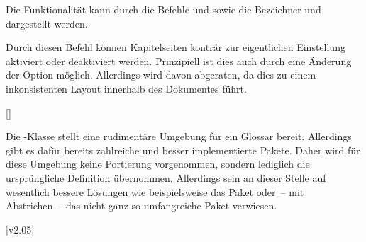 \begin{Declaration*}{}
\begin{Declaration}{}
\printdeclarationlist*%
%
Die Funktionalität kann durch die Befehle  und 
 sowie die Bezeichner  und 
 dargestellt werden.
\end{Declaration}

\begin{Declaration}{}
\printdeclarationlist*%
%
Durch diesen Befehl können Kapitelseiten konträr zur eigentlichen Einstellung 
aktiviert oder deaktiviert werden. Prinzipiell ist dies auch durch eine 
Änderung der Option  möglich. Allerdings wird davon 
abgeraten, da dies zu einem inkonsistenten Layout innerhalb des Dokumentes 
führt.
\end{Declaration}

\begin{Declaration}{[]}
\begin{Declaration}{}
\printdeclarationlist*%
%
Die -Klasse stellt eine rudimentäre Umgebung für ein Glossar 
bereit. Allerdings gibt es dafür bereits zahlreiche und besser implementierte 
Pakete. Daher wird für diese Umgebung keine Portierung vorgenommen, sondern 
lediglich die ursprüngliche Definition übernommen. Allerdings sein an dieser 
Stelle auf wesentlich bessere Lösungen wie beispielsweise das Paket 
 oder~-- mit Abstrichen~-- das nicht ganz so umfangreiche 
Paket  verwiesen. 
\end{Declaration}
\end{Declaration}
%
%
[v2.05]
\end{Declaration*}
